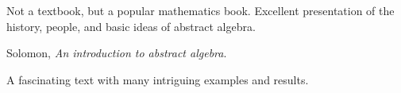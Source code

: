 \documentclass{ximera}
\begin{document}
\begin{thebibliography}{MMMM2002}
  \begin{annotate}
    Not a textbook, but a popular mathematics book. Excellent
    presentation of the history, people, and basic ideas of abstract
    algebra.
  \end{annotate}


  

   
 Solomon, \textit{An introduction to abstract algebra}.

  \begin{annotate}
    A fascinating text with many intriguing examples and results.
  \end{annotate}
  
\end{thebibliography}
\end{document}
